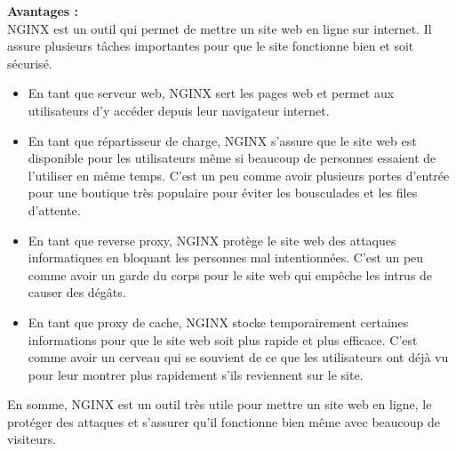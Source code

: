 \documentclass{article}
\begin{document}
\hspace{0.1cm}

{\bf Avantages :}\\

 NGINX est un outil qui permet de mettre un site web en ligne sur internet. Il assure plusieurs tâches importantes pour que le site fonctionne bien et soit sécurisé.\\

\begin{itemize}
    \item En tant que serveur web, NGINX sert les pages web et permet aux utilisateurs d'y accéder depuis leur navigateur internet.\\

    \item En tant que répartisseur de charge, NGINX s'assure que le site web est disponible pour les utilisateurs même si beaucoup de personnes essaient de l'utiliser en même temps. C'est un peu comme avoir plusieurs portes d'entrée pour une boutique très populaire pour éviter les bousculades et les files d'attente.\\

    \item En tant que reverse proxy, NGINX protège le site web des attaques informatiques en bloquant les personnes mal intentionnées. C'est un peu comme avoir un garde du corps pour le site web qui empêche les intrus de causer des dégâts.\\

    \item En tant que proxy de cache, NGINX stocke temporairement certaines informations pour que le site web soit plus rapide et plus efficace. C'est comme avoir un cerveau qui se souvient de ce que les utilisateurs ont déjà vu pour leur montrer plus rapidement s'ils reviennent sur le site.\\
\end{itemize}

En somme, NGINX est un outil très utile pour mettre un site web en ligne, le protéger des attaques et s'assurer qu'il fonctionne bien même avec beaucoup de visiteurs.\\

\hspace{0.1cm}
\end{document}
